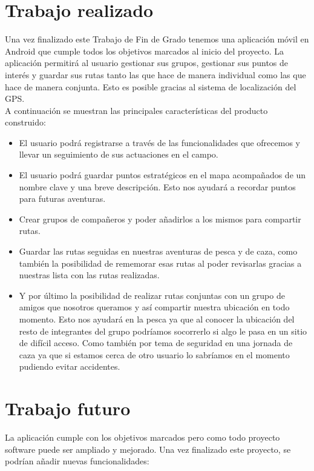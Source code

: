 

\section{Trabajo realizado}
Una vez finalizado este Trabajo de Fin de Grado tenemos una aplicación móvil en Android que cumple todos los objetivos marcados al inicio del proyecto. La aplicación permitirá al usuario gestionar sus grupos, gestionar sus puntos de interés y guardar sus rutas tanto las que hace de manera individual como las que hace de manera conjunta. Esto es posible gracias al sistema de localización del GPS.\\


A continuación se muestran las principales características del producto construido: 

\begin{itemize}
\item El usuario podrá registrarse a través  de las funcionalidades que ofrecemos y llevar un seguimiento de sus actuaciones en el campo.
\item El usuario podrá guardar puntos estratégicos en el mapa acompañados de un nombre clave y una breve descripción. Esto nos ayudará a recordar puntos para futuras aventuras. 
\item Crear grupos de compañeros y poder añadirlos a los mismos para compartir rutas.
\item Guardar las rutas seguidas en nuestras aventuras de pesca y de caza, como también la posibilidad de rememorar esas rutas al poder revisarlas gracias a nuestras lista con las rutas realizadas.
\item Y por último la posibilidad de realizar rutas conjuntas con un grupo de amigos que nosotros queramos y así compartir nuestra ubicación en todo momento. Esto nos ayudará en la pesca ya que al conocer la ubicación del resto de integrantes del grupo podríamos socorrerlo si algo le pasa en un sitio de difícil acceso. Como también por tema de seguridad en una jornada de caza ya que si estamos cerca de otro usuario lo sabríamos en el momento pudiendo evitar accidentes.
\end{itemize}  

\section{Trabajo futuro}
 La aplicación cumple con los objetivos marcados pero como todo proyecto software puede ser ampliado y mejorado. Una vez finalizado este proyecto, se podrían añadir nuevas funcionalidades:



